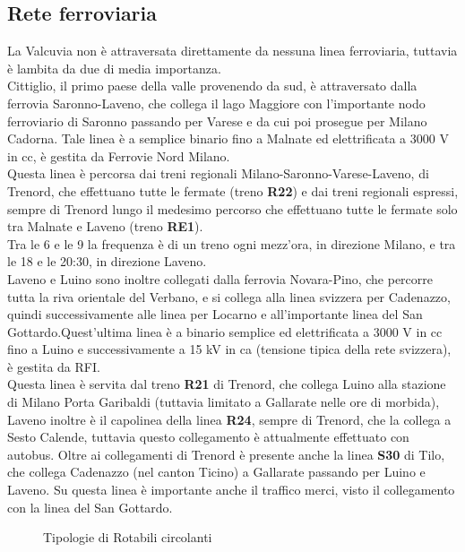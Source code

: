 \documentclass{article}
\begin{document}
\subsection{Rete ferroviaria}
La Valcuvia non è attraversata direttamente da nessuna linea ferroviaria, tuttavia è lambita da due di media importanza.\\
Cittiglio, il primo paese della valle provenendo da sud, è attraversato dalla ferrovia Saronno-Laveno, che collega il lago  Maggiore con l'importante nodo ferroviario di Saronno passando per Varese e da cui poi prosegue per Milano Cadorna. Tale linea è a semplice binario fino a Malnate ed elettrificata a 3000 V in cc, è gestita da Ferrovie Nord Milano.\\
Questa linea è percorsa dai treni regionali Milano-Saronno-Varese-Laveno, di Trenord, che effettuano tutte le fermate (treno \textbf{R22}) e dai treni regionali espressi, sempre di Trenord lungo il medesimo percorso che effettuano tutte le fermate solo tra Malnate e Laveno (treno \textbf{RE1}).\\
Tra le 6 e le 9 la frequenza è di un treno ogni mezz'ora, in direzione Milano, e tra le 18 e le 20:30, in direzione Laveno.\\
Laveno e Luino sono inoltre collegati dalla ferrovia Novara-Pino, che percorre tutta la riva orientale del Verbano, e si collega alla linea svizzera per Cadenazzo, quindi successivamente alle linea per Locarno e all'importante linea del San Gottardo.Quest'ultima linea è a binario semplice ed elettrificata a 3000 V in cc fino a Luino e successivamente a 15 kV in ca (tensione tipica della rete svizzera), è gestita da RFI.\\
Questa linea è servita dal treno \textbf{R21} di Trenord, che collega Luino alla stazione di Milano Porta Garibaldi (tuttavia limitato a Gallarate nelle ore di morbida), Laveno inoltre è il capolinea della linea \textbf{R24}, sempre di Trenord, che la collega a Sesto Calende, tuttavia questo collegamento è attualmente effettuato con autobus. Oltre ai collegamenti di Trenord è presente anche la linea \textbf{S30} di Tilo, che collega Cadenazzo (nel canton Ticino) a Gallarate passando per Luino e Laveno. Su questa linea è importante anche il traffico merci, visto il collegamento con la linea del San Gottardo.

\begin{figure}[H]
\centering
{}
\qquad
{}
\caption{Tipologie di Rotabili circolanti}
\end{figure}
\end{document}
